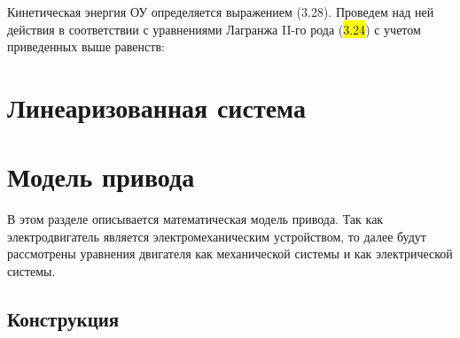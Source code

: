 Кинетическая энергия ОУ определяется выражением (3.28). Проведем над ней действия в соответствии с уравнениями Лагранжа II-го рода (\colorbox{Yellow}{3.24}) с учетом приведенных выше равенств:\par










\section{Линеаризованная система} \label{ch:ch3/sect10}

\section{Модель привода} \label{ch:ch3/sect9}

В этом разделе описывается математическая модель привода. Так как электродвигатель является электромеханическим устройством, то далее будут рассмотрены уравнения двигателя как механической системы и как электрической системы.

\subsection{Конструкция} \label{sec:ch3/sec9/sub1}

